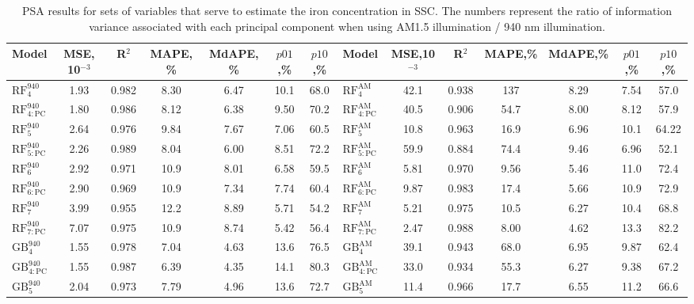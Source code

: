 \documentclass[a4paper,fleqn]{cas-sc}
\begin{document}
\begin{table}[<options>]
\caption{PSA results for sets of variables that serve to estimate the iron concentration in SSC.
The numbers represent the ratio of information variance associated with each principal component when using AM1.5 illumination / 940 nm illumination.
}
\label{tbl2}
\begin{tabular*}{\tblwidth}{@{}LCCCCCCLCCCCCC@{}}
\toprule
Model&MSE, 10$^{-3}$&R$^2$&MAPE, \%&MdAPE, \%&$p01$,\%&$p10$,\%&Model&MSE,10$^{-3}$&R$^2$&MAPE,\%&MdAPE,\%&$p01$,\%&$p10$,\%\\
\midrule
$\mathrm{RF}^{940}_{4}$&1.93&0.982&8.30&6.47&10.1&68.0&$\mathrm{RF}^\mathrm{AM}_{4}$&42.1&0.938&137&8.29&7.54&57.0\\
$\mathrm{RF}^{940}_{4:\mathrm{PC}}$&1.80&0.986&8.12&6.38&9.50&70.2&$\mathrm{RF}^\mathrm{AM}_{4:\mathrm{PC}}$&40.5&0.906&54.7&8.00&8.12&57.9\\
$\mathrm{RF}^{940}_{5}$&2.64&0.976&9.84&7.67&7.06&60.5&$\mathrm{RF}^\mathrm{AM}_{5}$&10.8&0.963&16.9&6.96&10.1&64.22\\
$\mathrm{RF}^{940}_{5:\mathrm{PC}}$&2.26&0.989&8.04&6.00&8.51&72.2&$\mathrm{RF}^\mathrm{AM}_{5:\mathrm{PC}}$&59.9&0.884&74.4&9.46&6.96&52.1\\
$\mathrm{RF}^{940}_{6}$&2.92&0.971&10.9&8.01&6.58&59.5&$\mathrm{RF}^\mathrm{AM}_{6}$&5.81&0.970&9.56&5.46&11.0&72.4\\
$\mathrm{RF}^{940}_{6:\mathrm{PC}}$&2.90&0.969&10.9&7.34&7.74&60.4&$\mathrm{RF}^\mathrm{AM}_{6:\mathrm{PC}}$&9.87&0.983&17.4&5.66&10.9&72.9\\
$\mathrm{RF}^{940}_{7}$&3.99&0.955&12.2&8.89&5.71&54.2&$\mathrm{RF}^\mathrm{AM}_{7}$&5.21&0.975&10.5&6.27&10.4&68.8\\
$\mathrm{RF}^{940}_{7:\mathrm{PC}}$&7.07&0.975&10.9&8.74&5.42&56.4&$\mathrm{RF}^\mathrm{AM}_{7:\mathrm{PC}}$&2.47&0.988&8.00&4.62&13.3&82.2\\
$\mathrm{GB}^{940}_{4}$&1.55&0.978&7.04&4.63&13.6&76.5&$\mathrm{GB}^\mathrm{AM}_{4}$&39.1&0.943&68.0&6.95&9.87&62.4\\
$\mathrm{GB}^{940}_{4:\mathrm{PC}}$&1.55&0.987&6.39&4.35&14.1&80.3&$\mathrm{GB}^\mathrm{AM}_{4:\mathrm{PC}}$&33.0&0.934&55.3&6.27&9.38&67.2\\
$\mathrm{GB}^{940}_{5}$&2.04&0.973&7.79&4.96&13.6&72.7&$\mathrm{GB}^\mathrm{AM}_{5}$&11.4&0.966&17.7&6.55&11.2&66.6\\

\end{tabular*}
\end{table}
\end{document}
